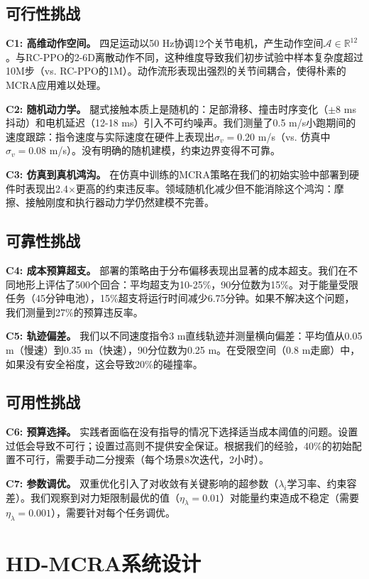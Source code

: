 \documentclass{article}
\begin{document}
\subsection{可行性挑战}

\textbf{C1: 高维动作空间。}
四足运动以50 Hz协调12个关节电机，产生动作空间$\mathcal{A}\in\mathbb{R}^{12}$。与RC-PPO的2-6D离散动作不同，这种维度导致我们初步试验中样本复杂度超过10M步（vs. RC-PPO的1M）。动作流形表现出强烈的关节间耦合，使得朴素的MCRA应用难以处理。

\textbf{C2: 随机动力学。}
腿式接触本质上是随机的：足部滑移、撞击时序变化（$\pm8$ ms抖动）和电机延迟（12-18 ms）引入不可约噪声。我们测量了0.5 m/s小跑期间的速度跟踪：指令速度与实际速度在硬件上表现出$\sigma_v=0.20$ m/s（vs. 仿真中$\sigma_v=0.08$ m/s）。没有明确的随机建模，约束边界变得不可靠。

\textbf{C3: 仿真到真机鸿沟。}
在仿真中训练的MCRA策略在我们的初始实验中部署到硬件时表现出2.4$\times$更高的约束违反率。领域随机化减少但不能消除这个鸿沟：摩擦、接触刚度和执行器动力学仍然建模不完善。

\subsection{可靠性挑战}

\textbf{C4: 成本预算超支。}
部署的策略由于分布偏移表现出显著的成本超支。我们在不同地形上评估了500个回合：平均超支为10-25\%，90分位数为15\%。对于能量受限任务（45分钟电池），15\%超支将运行时间减少6.75分钟。如果不解决这个问题，我们测量到27\%的预算违反率。

\textbf{C5: 轨迹偏差。}
我们以不同速度指令3 m直线轨迹并测量横向偏差：平均值从0.05 m（慢速）到0.35 m（快速），90分位数为0.25 m。在受限空间（0.8 m走廊）中，如果没有安全裕度，这会导致20\%的碰撞率。

\subsection{可用性挑战}

\textbf{C6: 预算选择。}
实践者面临在没有指导的情况下选择适当成本阈值的问题。设置过低会导致不可行；设置过高则不提供安全保证。根据我们的经验，40\%的初始配置不可行，需要手动二分搜索（每个场景8次迭代，2小时）。

\textbf{C7: 参数调优。}
双重优化引入了对收敛有关键影响的超参数（$\lambda_i$学习率、约束容差）。我们观察到对力矩限制最优的值（$\eta_\lambda=0.01$）对能量约束造成不稳定（需要$\eta_\lambda=0.001$），需要针对每个任务调优。

\section{HD-MCRA系统设计}
\label{sec:system}
\end{document}
